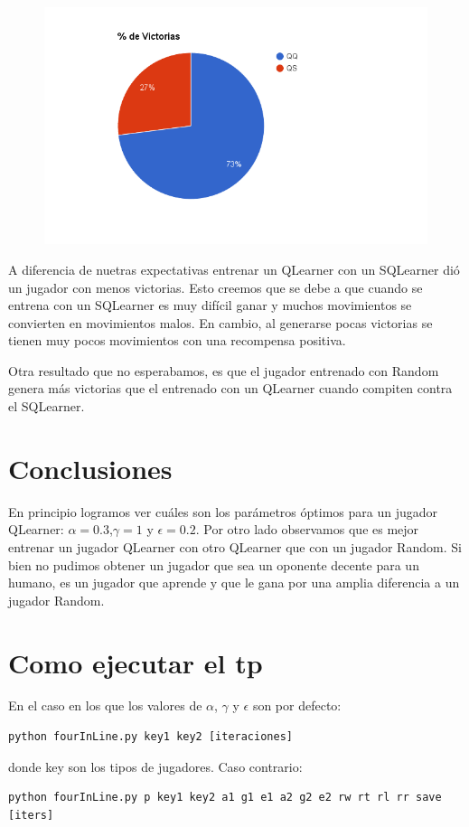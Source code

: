 \documentclass[10pt, a4paper]{article}
\begin{document}
\begin{figure}[H]
\begin{minipage}[c]{1\textwidth}
  \includegraphics[scale=0.3]{QQvsQS.png}
  \end{minipage}
\end{figure}

A diferencia de nuetras expectativas entrenar un QLearner con un SQLearner dió un jugador con menos victorias. Esto creemos que se debe a que cuando se entrena con un SQLearner es muy difícil ganar y muchos movimientos se convierten en movimientos malos. En cambio, al generarse pocas victorias se tienen muy pocos movimientos con una recompensa positiva.

Otra resultado que no esperabamos, es que el jugador entrenado con Random genera más victorias que el entrenado con un QLearner cuando compiten contra el SQLearner.



\section{Conclusiones}
En principio logramos ver cuáles son los parámetros óptimos para un jugador QLearner: $\alpha=0.3$,$\gamma=1$ y $\epsilon=0.2$.
Por otro lado observamos que es mejor entrenar un jugador QLearner con otro QLearner que con un jugador Random.
Si bien no pudimos obtener un jugador que sea un oponente decente para un humano, es un jugador que aprende y que le gana por una amplia diferencia a un jugador Random.


\section{Como ejecutar el tp}


En el caso en los que los valores de $\alpha$, $\gamma$ y $\epsilon$ son por defecto:
\begin{lstlisting}
python fourInLine.py key1 key2 [iteraciones]
\end{lstlisting}
donde key son los tipos de jugadores. Caso contrario: \\
\begin{lstlisting}
python fourInLine.py p key1 key2 a1 g1 e1 a2 g2 e2 rw rt rl rr save [iters]
\end{lstlisting}
\end{document}

